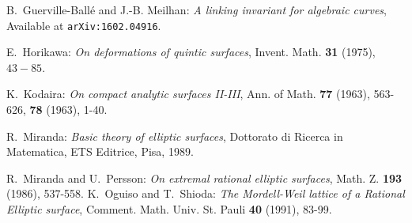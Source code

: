 \documentclass{article}
\begin{document}
\begin{thebibliography}{99}



%

 B.~Guerville-Ball\'e and J.-B. Meilhan: \emph{A linking invariant for algebraic curves}, Available at \texttt{arXiv:1602.04916}.

  E.~Horikawa: \emph{ On deformations of quintic surfaces},
\rm Invent. Math. {\bf 31} (1975), \rm $43 - 85$.
%


 K.~Kodaira: \emph{On compact analytic surfaces II-III}, Ann. of Math. \textbf{77}
(1963), 563-626, \textbf{78} (1963), 1-40.
  
 
 R.~Miranda: \emph{Basic theory of elliptic surfaces}, Dottorato di Ricerca in Matematica, ETS Editrice, Pisa, 1989.

 R.~Miranda and U.~Persson: \emph{
On extremal rational elliptic surfaces}, Math. Z. \textbf{193} (1986), 537-558.
%
%
%
  K.~Oguiso and T.~Shioda: \emph{The Mordell-Weil lattice of a Rational
Elliptic surface}, Comment. Math. Univ. St. Pauli \textbf{40} (1991), 83-99.
%
%


\end{thebibliography}
\end{document}
